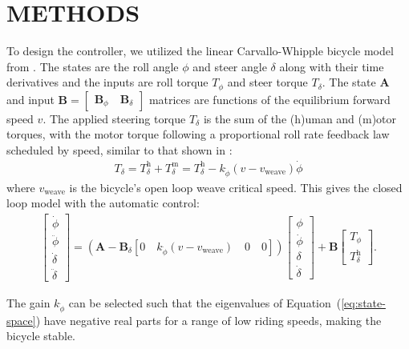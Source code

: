 \documentclass{icsc}
\begin{document}
\section{METHODS}
%
To design the controller, we utilized the linear Carvallo-Whipple bicycle model
from \cite{Meijaard2007}. The states are the roll angle \(\phi\) and steer
angle \(\delta\) along with their time derivatives and the inputs are roll
torque \(T_\phi\) and steer torque \(T_\delta\). The state \(\mathbf{A}\) and
input \(\mathbf{B} = \begin{bmatrix}\mathbf{B}_\phi \quad
\mathbf{B}_\delta\end{bmatrix} \) matrices are functions of the equilibrium
forward speed \(v\). The applied steering torque \(T_\delta\) is the sum of the
(h)uman and (m)otor torques, with the motor torque following a proportional
roll rate feedback law scheduled by speed, similar to that shown in
\cite{Schwab2008}:
%
\begin{align}
  T_\delta =
  T_\delta^\textrm{h} + T_\delta^\textrm{m} =
  T_\delta^\textrm{h} - k_{\dot{\phi}}(v - v_\textrm{weave})\dot{\phi}
\end{align}
where \(v_\textrm{weave}\) is the bicycle's open loop weave critical speed.
This gives the closed loop model with the automatic control:
%
\begin{align}
  \begin{bmatrix}
    \dot{\phi} \\ \ddot{\phi} \\ \dot{\delta} \\ \ddot{\delta}
  \end{bmatrix}
  =
  \left(
    \mathbf{A} - \mathbf{B}_\delta
    \left[0 \quad k_{\dot{\phi}}(v - v_\textrm{weave}) \quad 0 \quad 0\right]
  \right)
  \begin{bmatrix}
    \phi \\ \dot{\phi} \\ \delta \\ \dot{\delta}
  \end{bmatrix}
  +
  \mathbf{B}
  \begin{bmatrix} T_{\phi} \\ T_\delta^\textrm{h} \end{bmatrix}
  \textrm{.}
  \label{eq:state-space}
\end{align}

The gain \(k_{\dot{\phi}}\) can be selected such that the eigenvalues of
Equation~(\ref{eq:state-space}) have negative real parts for a range of low
riding speeds, making the bicycle stable.
\end{document}
